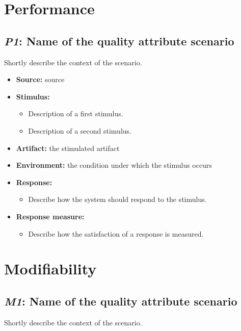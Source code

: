 \documentclass[english]{sareport}
\begin{document}
\section{Performance}
\subsection{\emph{P1}: Name of the quality attribute scenario}
Shortly describe the context of the scenario.

\begin{itemize}
    \item \textbf{Source:} source
    \item \textbf{Stimulus:}
        \begin{itemize}
            \item Description of a first stimulus.
            \item Description of a second stimulus.
        \end{itemize}

    \item \textbf{Artifact:} the stimulated artifact
    \item \textbf{Environment:} the condition under which the stimulus occurs
    \item \textbf{Response:}
        \begin{itemize}
            \item Describe how the system should respond to the stimulus.
        \end{itemize}

    \item \textbf{Response measure:}
        \begin{itemize}
            \item Describe how the satisfaction of a response is measured.
        \end{itemize}
\end{itemize}

\section{Modifiability}
\subsection{\emph{M1}: Name of the quality attribute scenario}
Shortly describe the context of the scenario.
\end{document}
